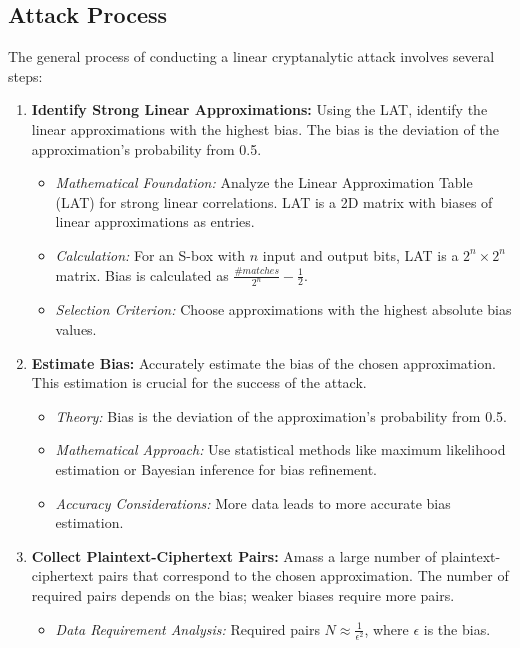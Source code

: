 \newpage
\subsection{Attack Process}

The general process of conducting a linear cryptanalytic attack involves several steps:

\begin{enumerate}
	\item \textbf{Identify Strong Linear Approximations:} Using the LAT, identify the linear approximations with the highest bias. The bias is the deviation of the approximation's probability from 0.5.
	\begin{itemize}
		\item \textit{Mathematical Foundation:} Analyze the Linear Approximation Table (LAT) for strong linear correlations. LAT is a 2D matrix with biases of linear approximations as entries.
		\item \textit{Calculation:} For an S-box with \( n \) input and output bits, LAT is a \( 2^n \times 2^n \) matrix. Bias is calculated as \( \frac{\#matches}{2^n} - \frac{1}{2} \).
		\item \textit{Selection Criterion:} Choose approximations with the highest absolute bias values.
	\end{itemize}
	\item \textbf{Estimate Bias:} Accurately estimate the bias of the chosen approximation. This estimation is crucial for the success of the attack.
	\begin{itemize}
		\item \textit{Theory:} Bias is the deviation of the approximation's probability from 0.5.
		\item \textit{Mathematical Approach:} Use statistical methods like maximum likelihood estimation or Bayesian inference for bias refinement.
		\item \textit{Accuracy Considerations:} More data leads to more accurate bias estimation.
	\end{itemize}
	\item \textbf{Collect Plaintext-Ciphertext Pairs:} Amass a large number of plaintext-ciphertext pairs that correspond to the chosen approximation. The number of required pairs depends on the bias; weaker biases require more pairs.
	\begin{itemize}
		\item \textit{Data Requirement Analysis:} Required pairs \( N \approx \frac{1}{\epsilon^2} \), where \( \epsilon \) is the bias.

\end{itemize}
\end{enumerate}
